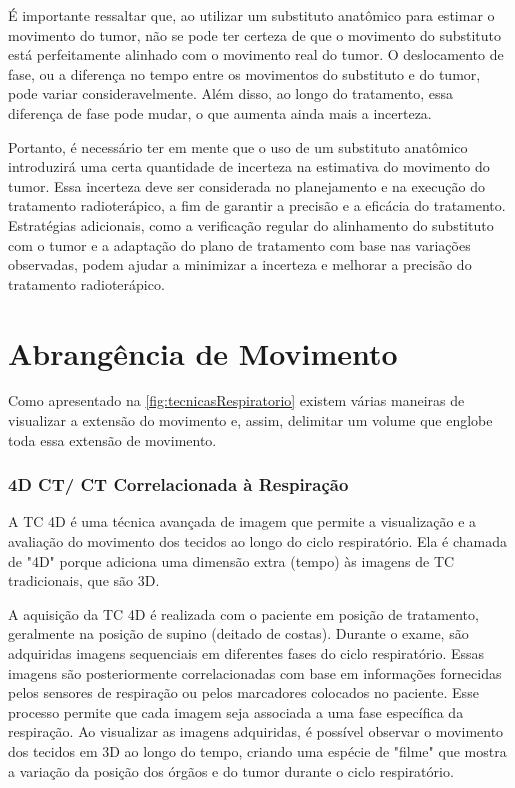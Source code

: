 \documentclass[11pt,a4paper]{article}
\begin{document}
	É importante ressaltar que, ao utilizar um substituto anatômico para estimar o movimento do tumor, não se pode ter certeza de que o movimento do substituto está perfeitamente alinhado com o movimento real do tumor. O deslocamento de fase, ou a diferença no tempo entre os movimentos do substituto e do tumor, pode variar consideravelmente. Além disso, ao longo do tratamento, essa diferença de fase pode mudar, o que aumenta ainda mais a incerteza.

	Portanto, é necessário ter em mente que o uso de um substituto anatômico introduzirá uma certa quantidade de incerteza na estimativa do movimento do tumor. Essa incerteza deve ser considerada no planejamento e na execução do tratamento radioterápico, a fim de garantir a precisão e a eficácia do tratamento. Estratégias adicionais, como a verificação regular do alinhamento do substituto com o tumor e a adaptação do plano de tratamento com base nas variações observadas, podem ajudar a minimizar a incerteza e melhorar a precisão do tratamento radioterápico.

\section{Abrangência de Movimento}

	Como apresentado na \ref{fig:tecnicasRespiratorio} existem várias maneiras de visualizar a extensão do movimento e, assim, delimitar um volume que englobe toda essa extensão de movimento.

\subsubsection*{4D CT/ CT Correlacionada à Respiração}

	A TC 4D é uma técnica avançada de imagem que permite a visualização e a avaliação do movimento dos tecidos ao longo do ciclo respiratório. Ela é chamada de "4D" porque adiciona uma dimensão extra (tempo) às imagens de TC tradicionais, que são 3D.

	A aquisição da TC 4D é realizada com o paciente em posição de tratamento, geralmente na posição de supino (deitado de costas). Durante o exame, são adquiridas imagens sequenciais em diferentes fases do ciclo respiratório. Essas imagens são posteriormente correlacionadas com base em informações fornecidas pelos sensores de respiração ou pelos marcadores colocados no paciente. Esse processo permite que cada imagem seja associada a uma fase específica da respiração. Ao visualizar as imagens adquiridas, é possível observar o movimento dos tecidos em 3D ao longo do tempo, criando uma espécie de "filme" que mostra a variação da posição dos órgãos e do tumor durante o ciclo respiratório.
\end{document}
